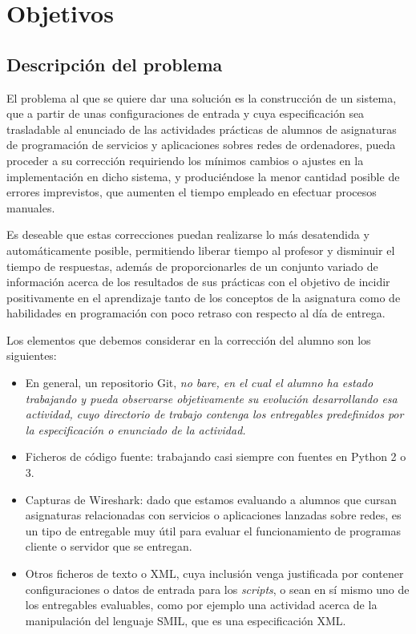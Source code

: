 \cleardoublepage
\chapter{Objetivos}
\label{chap:objetivos}


\section{Descripción del problema}
\label{sec:des_problema}


El problema al que se quiere dar una solución es la construcción de un sistema, que a partir de unas configuraciones de entrada  y cuya especificación sea trasladable al enunciado de las actividades prácticas de alumnos de asignaturas de programación de servicios y aplicaciones sobres redes de ordenadores, pueda proceder a su corrección requiriendo los mínimos cambios o ajustes en la implementación en dicho sistema, y produciéndose la menor cantidad posible de errores imprevistos, que aumenten el tiempo empleado en efectuar procesos manuales.


Es deseable que estas correcciones puedan realizarse lo más desatendida y automáticamente posible, permitiendo liberar tiempo al profesor y disminuir el tiempo de respuestas, además de proporcionarles de un conjunto variado de información acerca de los resultados de sus prácticas con el objetivo de incidir positivamente en el aprendizaje tanto de los conceptos de la asignatura como de habilidades en programación con poco retraso con respecto al día de entrega.


Los elementos que debemos considerar en la corrección del alumno son los siguientes:

\begin{itemize}
\item En general, un repositorio Git, \it{no bare}, en el cual el alumno ha estado trabajando y pueda observarse objetivamente su evolución desarrollando esa actividad, cuyo directorio de trabajo contenga los entregables predefinidos por la especificación o enunciado de la actividad.

\item Ficheros de código fuente: trabajando casi siempre con fuentes en Python 2 o 3.

\item Capturas de Wireshark: dado que estamos evaluando a alumnos que cursan asignaturas relacionadas con servicios o aplicaciones lanzadas sobre redes, es un tipo de entregable muy útil para evaluar el funcionamiento de programas cliente o servidor que se entregan.

\item Otros ficheros de texto o XML, cuya inclusión venga justificada por contener configuraciones o datos de entrada para los \textit{scripts}, o sean en sí mismo uno de los entregables evaluables, como por ejemplo una actividad acerca de la manipulación del lenguaje SMIL, que es una especificación XML.
\end{itemize}


